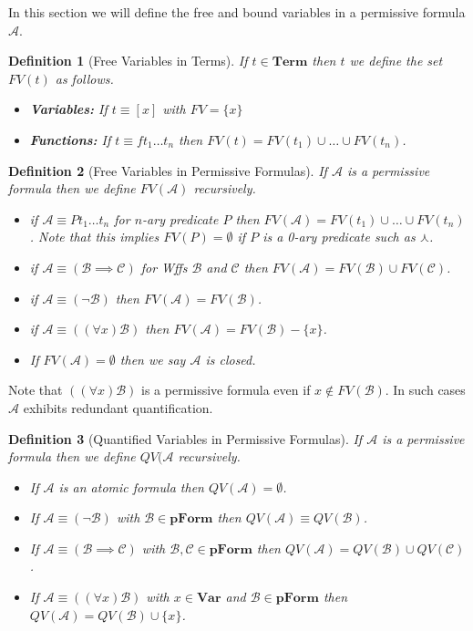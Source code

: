 \documentclass[12pt]{article}
\theoremstyle{break}
\newtheorem{definition}{Definition}[section]
\theoremstyle{break}
\theoremstyle{break}
\theoremstyle{break}
\newcommand{\mc}[1]{\mathcal{#1}}
\begin{document}
In this section we will define the free and bound variables in a permissive formula $\mc{A}$.


\begin{definition}[Free Variables in Terms]
If $t\in \textbf{Term}$ then $t$ we define the set $FV(t)$ as follows.
\begin{itemize}
\item{\textbf{Variables:} If $t\equiv [x]$ with $FV = \{x\}$}
\item{\textbf{Functions:} If $t\equiv ft_1\ldots t_n$ then $FV(t) = FV(t_1)\cup\ldots \cup FV(t_n)$.}
\end{itemize}
\end{definition}

\begin{definition}[Free Variables in Permissive Formulas]
If $\mc{A}$ is a permissive formula then we define $FV(\mc{A})$ recursively.
\begin{itemize}
\item{if $\mc{A} \equiv Pt_1\ldots t_n$ for $n$-ary predicate $P$ then $FV(\mc{A}) = FV(t_1)\cup\ldots\cup FV(t_n)$. Note that this implies $FV(P)=\emptyset$ if $P$ is a 0-ary predicate such as $\curlywedge$.}
\item{if $\mc{A} \equiv (\mc{B}\implies \mc{C})$ for Wffs $\mc{B}$ and $\mc{C}$ then $FV(\mc{A}) = FV(\mc{B})\cup FV(\mc{C})$.}
\item{if $\mc{A} \equiv (\lnot\mc{B})$ then $FV(\mc{A}) = FV(\mc{B})$.}
\item{if $\mc{A} \equiv ((\forall x)\mc{B})$ then $FV(\mc{A}) = FV(\mc{B}) - \{x\}$.}
\item{If $FV(\mc{A}) = \emptyset$ then we say $\mc{A}$ is closed.}
\end{itemize}
\end{definition}

Note that $((\forall x) \mc{B})$ is a permissive formula even if $x\not \in FV(\mc{B})$.
In such cases $\mc{A}$ exhibits redundant quantification.

\begin{definition}[Quantified Variables in Permissive Formulas]
If $\mc{A}$ is a permissive formula then we define $QV(\mc{A}$ recursively.

\begin{itemize}
\item{If $\mc{A}$ is an atomic formula then $QV(\mc{A}) = \emptyset$.}
\item{If $\mc{A} \equiv (\lnot \mc{B})$ with $\mc{B}\in\textbf{pForm}$ then $QV(\mc{A}) \equiv QV(\mc{B})$.}
\item{If $\mc{A} \equiv (\mc{B} \implies \mc{C})$ with $\mc{B}, \mc{C}\in\textbf{pForm}$ then $QV(\mc{A}) = QV(\mc{B}) \cup QV(\mc{C})$.}
\item{If $\mc{A} \equiv ((\forall x) \mc{B})$ with $x\in\textbf{Var}$ and $\mc{B}\in\textbf{pForm}$ then $QV(\mc{A}) = QV(\mc{B}) \cup \{x\}$.}
\end{itemize}
\end{definition}
\end{document}
